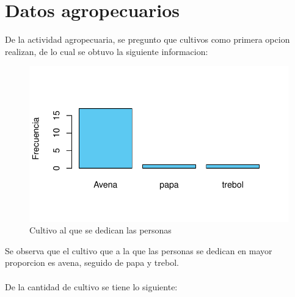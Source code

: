 \documentclass[12pt]{article}\usepackage[]{graphicx}\usepackage[]{xcolor}
\makeatletter
\def\maxwidth{ %
  \ifdim\Gin@nat@width>\linewidth
    \linewidth
  \else
    \Gin@nat@width
  \fi
}
\newenvironment{knitrout}{}{} %
\makeatother
\begin{document}
	\section{Datos agropecuarios}
	De la actividad agropecuaria, se pregunto que cultivos como primera opcion realizan, de lo cual se obtuvo la siguiente informacion:
	\begin{figure}[H]
	\centering
\begin{knitrout}
\color{fgcolor}
\includegraphics[width=\maxwidth]{figure/seven-1} 
\end{knitrout}
	\caption{Cultivo al que se dedican las personas}
	\end{figure}
	Se observa que el cultivo que a la que las personas se dedican en mayor proporcion es avena, seguido de papa y trebol.\\
	\\
	De la cantidad de cultivo se tiene lo siguiente:
\end{document}
